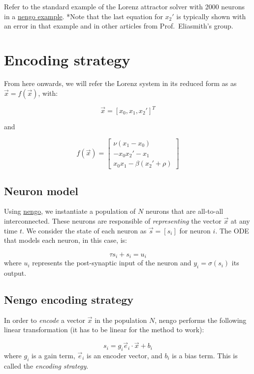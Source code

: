 \documentclass{report}
\begin{document}
Refer to the standard example of the Lorenz attractor solver with 2000
neurons in a
\href{https://github.com/nengo/nengo/blob/master/examples/dynamics/lorenz_attractor.ipynb}{nengo
example}. *Note that the last equation for \(x_2'\) is typically shown
with an error in that example and in other articles from
Prof.~Eliasmith's group.

\section{Encoding strategy}\label{encoding-strategy}

From here onwards, we will refer the Lorenz system in its reduced form
as as \(\vec x = f(\vec x)\), with:

\[
\vec x = [x_0, x_1, x_2']^T
\]

and

\[
f(\vec x) = \left[
\begin{array}{c}
\nu(x_1 - x_0) \\
- x_0 x_2'- x_1 \\
x_0 x_1 - \beta (x_2' + \rho)
\end{array}
\right]
\]

\subsection{Neuron model}\label{neuron-model}

Using \href{http://www.nengo.ca}{nengo}, we instantiate a population of
\(N\) neurons that are all-to-all interconnected. These neurons are
responsible of \emph{representing} the vector \(\vec x\) at any time
\(t\). We consider the state of each neuron as \(\vec s = [s_i]\) for
neuron \(i\). The ODE that models each neuron, in this case, is:

\[\tau s_i + s_i = u_i \] where \(u_i\) represents the post-synaptic
input of the neuron and \(y_i=\sigma(s_i)\) its output.

\subsection{Nengo encoding strategy}\label{nengo-encoding-strategy}

In order to \emph{encode} a vector \(\vec x\) in the population \(N\),
nengo performs the following linear transformation (it has to be linear
for the method to work):

\[ s_i = g_i \vec e_i \cdot \vec x + b_i \] where \(g_i\) is a gain
term, \(\vec e_i\) is an encoder vector, and \(b_i\) is a bias term.
This is called the \emph{encoding strategy}.
\end{document}
